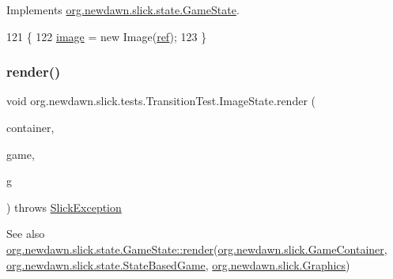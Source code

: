 Implements \mbox{\hyperlink{interfaceorg_1_1newdawn_1_1slick_1_1state_1_1_game_state_aa799a369e0fcfe6822d2d586fa6f5bbc}{org.\+newdawn.\+slick.\+state.\+Game\+State}}.


\begin{DoxyCode}
121                                                                                              \{
122             \mbox{\hyperlink{classorg_1_1newdawn_1_1slick_1_1tests_1_1_transition_test_1_1_image_state_a930e1e326fbc77f8b9c47f6c04718744}{image}} = \textcolor{keyword}{new} Image(\mbox{\hyperlink{classorg_1_1newdawn_1_1slick_1_1tests_1_1_transition_test_1_1_image_state_a8aa86f789ef4cf8dbcd93a9de42d0e1c}{ref}});
123         \}
\end{DoxyCode}
\mbox{\label{classorg_1_1newdawn_1_1slick_1_1tests_1_1_transition_test_1_1_image_state_a618c4ccf2c0b81b9f7d1bf75f94d7325}} 
\subsubsection{\texorpdfstring{render()}{render()}}
{\footnotesize\ttfamily void org.\+newdawn.\+slick.\+tests.\+Transition\+Test.\+Image\+State.\+render (\begin{DoxyParamCaption}\item[{\mbox{\hyperlink{classorg_1_1newdawn_1_1slick_1_1_game_container}{Game\+Container}}}]{container,  }\item[{\mbox{\hyperlink{classorg_1_1newdawn_1_1slick_1_1state_1_1_state_based_game}{State\+Based\+Game}}}]{game,  }\item[{\mbox{\hyperlink{classorg_1_1newdawn_1_1slick_1_1_graphics}{Graphics}}}]{g }\end{DoxyParamCaption}) throws \mbox{\hyperlink{classorg_1_1newdawn_1_1slick_1_1_slick_exception}{Slick\+Exception}}\hspace{0.3cm}{\ttfamily [inline]}}

\begin{DoxySeeAlso}{See also}
\mbox{\hyperlink{interfaceorg_1_1newdawn_1_1slick_1_1state_1_1_game_state_a065352d2725274c5244cd022f226eb17}{org.\+newdawn.\+slick.\+state.\+Game\+State\+::render}}(\mbox{\hyperlink{classorg_1_1newdawn_1_1slick_1_1_game_container}{org.\+newdawn.\+slick.\+Game\+Container}}, \mbox{\hyperlink{classorg_1_1newdawn_1_1slick_1_1state_1_1_state_based_game}{org.\+newdawn.\+slick.\+state.\+State\+Based\+Game}}, \mbox{\hyperlink{classorg_1_1newdawn_1_1slick_1_1_graphics}{org.\+newdawn.\+slick.\+Graphics}}) 
\end{DoxySeeAlso}


